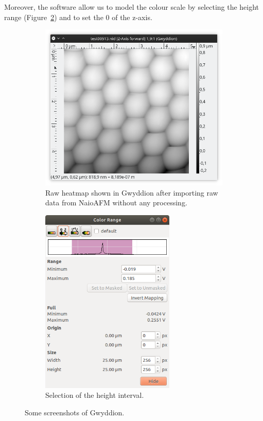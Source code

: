 \documentclass[11pt,a4paper]{article}
\begin{document}
Moreover, the software allow us to model the colour scale by selecting the height range (Figure~\ref{fig:scale_selection}) and to set the 0 of the z-axis.

\begin{figure}[ht]
\centering
\begin{subfigure}[b]{0.45\textwidth}
\includegraphics[width=\textwidth]{heatmap_rawdata}
\caption{Raw heatmap shown in Gwyddion after importing raw data from NaioAFM without any processing.}
\label{fig:heatmap_rawdata}
\end{subfigure}
\begin{subfigure}[b]{0.45\textwidth}
\centering
\includegraphics[width=0.7\textwidth]{scale_selection}
\caption{Selection of the height interval.}
\label{fig:scale_selection}
\end{subfigure}
\caption{Some screenshots of Gwyddion.}
\label{fig:gwyddion}
\end{figure}
\end{document}
